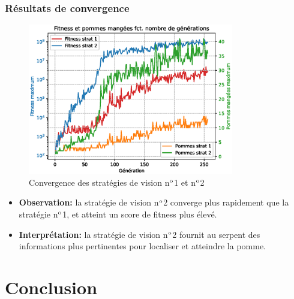 \documentclass[10pt]{beamer}
\begin{document}
\begin{frame}
\frametitle{Résultats de convergence}
\begin{figure}
\vspace{-0.3cm}
\includegraphics[width=0.8\textwidth]{curve_compare_cv.eps}
\vspace{-0.4cm}
\caption*{\tiny Convergence des stratégies de vision n$\textsuperscript{o}$1 et n$\textsuperscript{o}$2}
\end{figure}
\vspace{-0.4cm}
\begin{itemize}
\footnotesize
\item \textbf{Observation:} la stratégie de vision n$\textsuperscript{o}$2 converge plus rapidement que la stratégie n$\textsuperscript{o}$1, et atteint un score de fitness plus élevé.
\item \textbf{Interprétation:} la stratégie de vision n$\textsuperscript{o}$2 fournit au serpent des informations plus pertinentes pour localiser et atteindre la pomme.
\end{itemize}

\end{frame}

\section{Conclusion}
\end{document}
